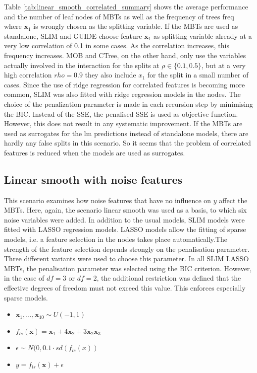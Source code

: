 Table \ref{tab:linear_smooth_correlated_summary} shows the average performance and the number of leaf nodes of MBTs  as well as the frequency of trees freq where $\textbf{x}_1$ is wrongly chosen as the splitting variable.
If the MBTs are used as standalone, SLIM and GUIDE choose feature $\textbf{x}_1$ as splitting variable already at a very low correlation of 0.1 in some cases. As the correlation increases, this frequency increases. MOB and CTree, on the other hand, only use the variables actually involved in the interaction for the splits at $\rho \in \{0.1, 0.5\}$, but at a very high correlation $rho = 0.9$ they also include $x_1$ for the split in a small number of cases. 
Since the use of ridge regression for correlated features is becoming more common, SLIM was also fitted with ridge regression models in the nodes. The choice of the penalization parameter is made in each recursion step by minimising the BIC. Instead of the SSE, the penalised SSE is used as objective function. However, this does not result in any systematic improvement. 
If the MBTs are used as surrogates for the lm predictions instead of standalone models, there are hardly any false splits in this scenario. So it seems that the problem of correlated features is reduced when the models are used as surrogates.


\subsection{Linear smooth with noise features}
This scenario examines how noise features that have no influence on $y$ affect the MBTs. Here, again, the scenario linear smooth was used as a basis, to which six noise variables were added.
In addition to the usual models, SLIM models were fitted with LASSO regression models. LASSO models allow the fitting of sparse models, i.e. a feature selection in the nodes takes place automatically.The strength of the feature selection depends strongly on the penalisation parameter. Three different variants were used to choose this parameter. In all SLIM LASSO MBTs, the penalisation parameter was selected using the BIC criterion. However, in the case of $df = 3$ or $df = 2$, the additional restriction was defined that the effective degrees of freedom must not exceed this value. This enforces especially sparse models.

\begin{itemize}
    \item $\textbf{x}_1,..., \textbf{x}_{10} \sim U(-1,1)$
    \item $ f_{ls}(\textbf{x}) = \textbf{x}_1 + 4   \textbf{x}_2 + 3   \textbf{x}_2   \textbf{x}_3 $
    \item $\epsilon \sim N(0, 0.1 \cdot sd(f_{ls}(x))$
    \item $y = f_{ls}(\textbf{x}) + \epsilon$
\end{itemize}

